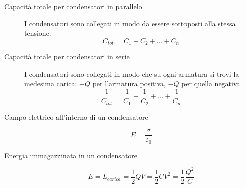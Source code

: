 \documentclass[a4paper,11pt,italian]{article}
\begin{document}
\begin{description}
  \item[Capacità totale per condensatori in parallelo] 
  I condensatori sono collegati in modo da essere sottoposti alla stessa tensione.
  \[ C_{tot} = C_1 + C_2 + \ldots + C_n \]
  
  \item[Capacità totale per condensatori in serie] 
  I condensatori sono collegati in modo che su ogni armatura si trovi la medesima carica: $ +Q $ per l'armatura positiva, $ -Q $ per quella negativa.
  \[ \frac{1}{C_{tot}} = \frac{1}{C_1} + \frac{1}{C_2} + \ldots + \frac{1}{C_n}  \]
  
  \item[Campo elettrico all'interno di un condensatore]
  \[ E = \frac{\sigma}{\varepsilon_0} \]
  
  \item[Energia immagazzinata in un condensatore]
  \[ E = L_{carica} = \frac{1}{2} QV = \frac{1}{2} CV^2 = \frac{1}{2} \frac{Q^2}{C} \]
\end{description}
\end{document}
